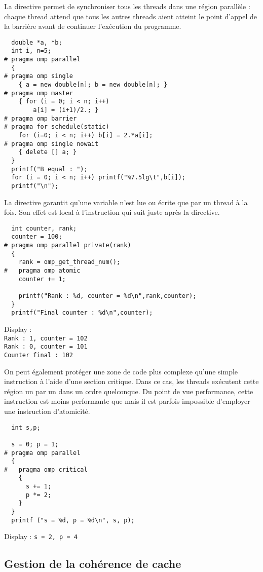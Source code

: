 \documentclass[fleqn,11pt]{article}
\begin{document}
La directive \verb@barrier@ permet de synchroniser tous les threads dans une région
parallèle : chaque thread attend que tous les autres threads aient atteint le point
d'appel de la barrière avant de continuer l'exécution du programme.

\begin{lstlisting}
  double *a, *b;
  int i, n=5;
# pragma omp parallel
  {
# pragma omp single
    { a = new double[n]; b = new double[n]; }
# pragma omp master
    { for (i = 0; i < n; i++)
        a[i] = (i+1)/2.; }
# pragma omp barrier
# pragma for schedule(static)
    for (i=0; i < n; i++) b[i] = 2.*a[i];
# pragma omp single nowait
    { delete [] a; }
  }
  printf("B equal : ");
  for (i = 0; i < n; i++) printf("%7.5lg\t",b[i]);
  printf("\n");
\end{lstlisting}

La directive \verb@atomic@ garantit qu'une variable n'est lue ou écrite que par un thread à la
fois. Son effet est local à l'instruction qui suit juste après la directive.

\begin{lstlisting}
  int counter, rank;
  counter = 100;
# pragma omp parallel private(rank)
  {
    rank = omp_get_thread_num();
#   pragma omp atomic
    counter += 1;
    
    printf("Rank : %d, counter = %d\n",rank,counter);
  }
  printf("Final counter : %d\n",counter);
\end{lstlisting}

Display :\\
\texttt{Rank : 1, counter = 102 \\
Rank : 0, counter = 101\\
Counter final : 102}

On peut également protéger une zone de code plus complexe
qu'une simple instruction à l'aide d'une section critique.
Dans ce cas, les threads exécutent cette région un par un
dans un ordre quelconque. Du point de vue performance,
cette instruction est moins performante que \verb@atomic@
mais il est parfois impossible d'employer une instruction
d'atomicité.

\begin{lstlisting}
  int s,p;

  s = 0; p = 1;
# pragma omp parallel
  {
#   pragma omp critical
    {
      s += 1;
      p *= 2;
    }
  }
  printf ("s = %d, p = %d\n", s, p);
\end{lstlisting}
Display : \texttt{s = 2, p = 4}

\subsection{Gestion de la cohérence de cache}
\end{document}

